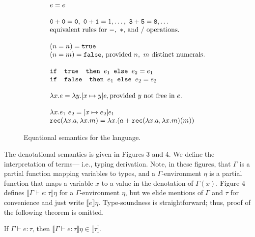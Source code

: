 \begin{figure}
\[
\begin{array}{lr}
e = e \\ \\
\texttt{0} + \texttt{0} = \texttt{0}, \ \texttt{0} + \texttt{1} = 1, \ldots, \ \texttt{3} + \texttt{5} = \texttt{8}, \ldots  \\
\text{equivalent rules for } -, \ * \text{, and } /\text{ operations.}
\\ \\
(n =n) = \texttt{true} \\ (n=m) = \texttt{false}\text{, provided } n, \ m \text{ distinct numerals.}\\ \\ 
\ifelse{\texttt{ true }}{e_1}{e_2} = e_1 \\
\ifelse{\texttt{ false }}{e_1}{e_2} = e_2 \\ \\ 
\lambda x.e = \lambda y.[x \mapsto y]e, \text{provided } y \text{ not free in } e. \\ \\ 
\lambda x.e_1 \ e_2 = [x \mapsto e_2]e_1 \\
\texttt{rec}(\lambda x.a, \lambda x.m) = 
			\lambda x.(a + \texttt{rec}(\lambda x.a, \lambda x.m)(m)) 
\end{array}
\]
\caption{Equational semantics for the language.}
\label{fig:eqsem}
\end{figure}

The denotational semantics is given in Figures 3 and 4. We define the interpretation of terms---
i.e., typing derivation. Note, in these figures, that $\Gamma$ is a partial function mapping variables to types, and a
 $\Gamma$-environment $\eta$ is a partial function that maps a variable $x$ to a value in the
 denotation of $\Gamma(x)$. Figure 4 defines $\llbracket \Gamma \vdash e: \tau\rrbracket\eta$ for 
a $\Gamma$-environment $\eta$, but we elide mentions of $\Gamma$ and $\tau$ for convenience and just write
$\llbracket e\rrbracket\eta$. Type-soundness is straightforward; thus, proof of the following theorem is omitted.

\begin{thm}
If $\Gamma \vdash e:\tau$, then $\llbracket \Gamma \vdash e : \tau \rrbracket\eta \in \llbracket \tau \rrbracket$.
\end{thm}

